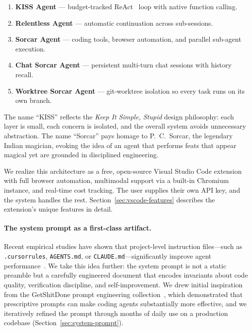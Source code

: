 \documentclass{article}
\begin{document}
\begin{enumerate}[nosep]
  \item \textbf{KISS Agent} --- budget-tracked
    ReAct~\citep{yao2023react} loop with native function calling.
  \item \textbf{Relentless Agent} --- automatic continuation across
    sub-sessions.
  \item \textbf{Sorcar Agent} --- coding tools, browser automation,
    and parallel sub-agent execution.
  \item \textbf{Chat Sorcar Agent} --- persistent multi-turn chat
    sessions with history recall.
  \item \textbf{Worktree Sorcar Agent} --- git-worktree isolation so
    every task runs on its own branch.
\end{enumerate}

The name ``KISS'' reflects the \emph{Keep It Simple, Stupid} design
philosophy: each layer is small, each concern is isolated, and the
overall system avoids unnecessary abstraction.  The name ``Sorcar''
pays homage to P.~C.~Sorcar, the legendary Indian magician, evoking
the idea of an agent that performs feats that appear magical yet are
grounded in disciplined engineering.

We realize this architecture as a free, open-source Visual Studio Code
extension with full browser automation, multimodal support via a
built-in Chromium instance, and real-time cost tracking.  The user
supplies their own API key, and the system handles the rest.
Section~\ref{sec:vscode-features} describes the extension's unique
features in detail.

\paragraph{The system prompt as a first-class artifact.}
Recent empirical studies have shown that project-level instruction
files---such as \texttt{.cursorrules}, \texttt{AGENTS.md}, or
\texttt{CLAUDE.md}---significantly improve agent
performance~\citep{chatlatanagulchai2025readmes,mohsenimofidi2025context}.
We take this idea further: the system prompt is not a static preamble
but a carefully engineered document that encodes invariants about code
quality, verification discipline, and self-improvement.  We drew
initial inspiration from the GetShitDone prompt engineering
collection~\citep{getshitdone2025}, which demonstrated that
prescriptive prompts can make coding agents substantially more
effective, and we iteratively refined the prompt through months of
daily use on a production codebase (Section~\ref{sec:system-prompt}).
\end{document}

